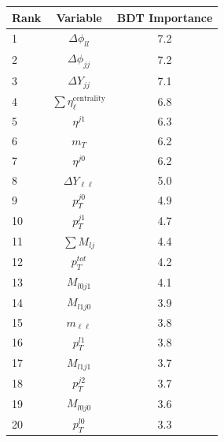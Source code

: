 \begin{table}[h!]
\centering
\begin{tabular}{|l|c|c|}
\hline
Rank &	Variable  & BDT Importance \\
\hline
1 &  $\Delta \phi_{ll}$ & 7.2    \\
2 &  $\Delta \phi_{jj}$ &  7.2\\
3 &  $\Delta Y_{jj}$   & 7.1    \\
4 &  $\sum\eta_\ell^{\mathrm{centrality}}$ & 6.8   \\
5 &  $\eta^{j1}$ &  6.3  \\
6 &  $m_T$     &  6.2  \\
7 &  $\eta^{j0}$ &  6.2  \\
8 &  $\Delta Y_{\ell\ell}$   & 5.0   \\
9 &  $p_T^{j0}$  & 4.9   \\
10  & $p_T^{j1}$ & 4.7   \\
11  & $\sum M_{lj}$& 4.4   \\
12  & $p_T^{tot}$ & 4.2   \\
13  & $M_{l0j1}$& 4.1   \\
14  & $M_{l1j0}$& 3.9   \\
15  & $m_{\ell\ell}$   & 3.8   \\
16  & $p_T^{l1}$  & 3.8   \\
17  & $M_{l1j1}$& 3.7   \\
18  & $p_T^{j2}$  & 3.7   \\
19  & $M_{l0j0}$& 3.6   \\
20  & $p_T^{l0}$  & 3.3   \\ 
\hline
\end{tabular}
\label{tab:rankingmulti}
\end{table}

